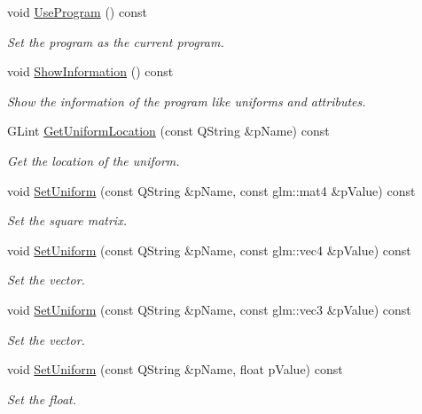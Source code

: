 \begin{DoxyCompactItemize}
void \hyperlink{class_g_l_s_l_program_a400524ae43056ee92d52e37ecc663cbb}{Use\+Program} () const 
\begin{DoxyCompactList}\small\item\em Set the program as the current program. \end{DoxyCompactList}\item 
void \hyperlink{class_g_l_s_l_program_abd26e78da1b3bef8b8ed53f5eb8ffdcb}{Show\+Information} () const 
\begin{DoxyCompactList}\small\item\em Show the information of the program like uniforms and attributes. \end{DoxyCompactList}\item 
G\+Lint \hyperlink{class_g_l_s_l_program_a930c3a73d1e570c30de96b03f9c55614}{Get\+Uniform\+Location} (const Q\+String \&p\+Name) const 
\begin{DoxyCompactList}\small\item\em Get the location of the uniform. \end{DoxyCompactList}\item 
void \hyperlink{class_g_l_s_l_program_a0c3e2524f09844877e3989c9de821975}{Set\+Uniform} (const Q\+String \&p\+Name, const glm\+::mat4 \&p\+Value) const 
\begin{DoxyCompactList}\small\item\em Set the square matrix. \end{DoxyCompactList}\item 
void \hyperlink{class_g_l_s_l_program_a37395411081d83148ed7182450913ed7}{Set\+Uniform} (const Q\+String \&p\+Name, const glm\+::vec4 \&p\+Value) const 
\begin{DoxyCompactList}\small\item\em Set the vector. \end{DoxyCompactList}\item 
void \hyperlink{class_g_l_s_l_program_ac2e9a52dd740f6b7935597cff9306355}{Set\+Uniform} (const Q\+String \&p\+Name, const glm\+::vec3 \&p\+Value) const 
\begin{DoxyCompactList}\small\item\em Set the vector. \end{DoxyCompactList}\item 
void \hyperlink{class_g_l_s_l_program_a263c20f7e4118b2bc9e7d5862f903034}{Set\+Uniform} (const Q\+String \&p\+Name, float p\+Value) const 
\begin{DoxyCompactList}\small\item\em Set the float. \end{DoxyCompactList}\item 

\end{DoxyCompactItemize}
